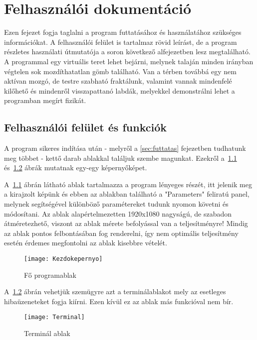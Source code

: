 \chapter{Felhasználói dokumentáció} %
\label{ch:user}

Ezen fejezet fogja taglalni a program futtatásához és használatához szükséges információkat. A felhasználói felület is tartalmaz rövid leírást, de a program részletes használati útmutatója a soron következő alfejezetben lesz megtalálható. A programmal egy virtuális teret lehet bejárni, melynek talaján minden irányban végtelen sok mozdíthatatlan gömb található. Van a térben továbbá egy nem aktívan mozgó, de testre szabható fraktálunk, valamint vannak mindenfelé kilőhető és mindenről visszapattanó labdák, melyekkel demonstrálni lehet a programban megírt fizikát.


\section{Felhasználói felület és funkciók} 
\label{sec:ui} 
A program sikeres indítása után - melyről a \ref{sec:futtatas} fejezetben tudhatunk meg többet - kettő darab ablakkal találjuk szembe magunkat. Ezekről a~\ref{fig:Kezdokepernyo} és~\ref{fig:Terminal} ábrák mutatnak egy-egy képernyőképet.

A~\ref{fig:Kezdokepernyo} ábrán látható ablak tartalmazza a program lényeges részét, itt jelenik meg a kirajzolt képünk és ebben az ablakban található a "Parameters" feliratú panel, melynek segítségével különböző paramétereket tudunk nyomon követni és módosítani. Az ablak alapértelmezetten 1920x1080 nagyságú, de szabadon átméretezhető, viszont az ablak mérete befolyással van a teljesítményre! Mindig az ablak pontos felbontásában fog renderelni, így nem optimális teljesítmény esetén érdemes megfontolni az ablak kisebbre vételét.

\begin{figure}[H]
	\centering
	\texttt{[image: Kezdokepernyo]}
	\caption{Fő programablak}
	\label{fig:Kezdokepernyo}
\end{figure}

A~\ref{fig:Terminal} ábrán vehetjük szemügyre azt a terminálablakot mely az esetleges hibaüzeneteket fogja kiírni. Ezen kívül ez az ablak más funkcióval nem bír.

\begin{figure}[H]
	\centering
	\texttt{[image: Terminal]}
	\caption{Terminál ablak}
	\label{fig:Terminal}
\end{figure}

